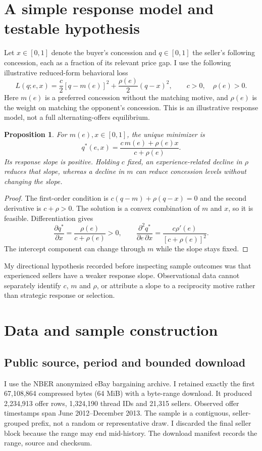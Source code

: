 \documentclass[11pt,a4paper]{article}
\newtheorem{proposition}{Proposition}
\begin{document}
\section{A simple response model and testable hypothesis}
Let $x\in[0,1]$ denote the buyer's concession and $q\in[0,1]$ the seller's
following concession, each as a fraction of its relevant price gap. I use
the following illustrative reduced-form behavioral loss
\begin{equation}
L(q;e,x)=\frac{c}{2}[q-m(e)]^2+\frac{\rho(e)}{2}(q-x)^2,
\qquad c>0,\quad\rho(e)>0.\label{eq:loss}
\end{equation}
Here $m(e)$ is a preferred concession without the matching motive, and
$\rho(e)$ is the weight on matching the opponent's concession. This is an
illustrative response model, not a full alternating-offers equilibrium.
\begin{proposition}
For $m(e),x\in[0,1]$, the unique minimizer is
\[
q^*(e,x)=\frac{c\,m(e)+\rho(e)x}{c+\rho(e)}.
\]
Its response slope is positive. Holding $c$ fixed, an experience-related
decline in $\rho$ reduces that slope, whereas a decline in $m$ can reduce
concession levels without changing the slope.
\end{proposition}
\begin{proof}
The first-order condition is $c(q-m)+\rho(q-x)=0$ and the second derivative
is $c+\rho>0$. The solution is a convex combination of $m$ and $x$, so it is
feasible. Differentiation gives
\[
\frac{\partial q^*}{\partial x}=\frac{\rho(e)}{c+\rho(e)}>0,\qquad
\frac{\partial^2q^*}{\partial e\,\partial x}
=\frac{c\rho'(e)}{[c+\rho(e)]^2}.
\]
The intercept component can change through $m$ while the slope stays fixed.
\end{proof}
My directional hypothesis recorded before inspecting sample outcomes was
that experienced sellers have a weaker response slope. Observational data
cannot separately identify $c$, $m$ and $\rho$, or attribute a slope to a
reciprocity motive rather than strategic response or selection.

\section{Data and sample construction}
\subsection{Public source, period and bounded download}
I use the NBER anonymized eBay bargaining archive. I retained exactly the
first 67,108,864 compressed bytes (64 MiB) with a byte-range download.
It produced 2,234,913 offer rows, 1,324,190 thread IDs and 21,315 sellers.
Observed offer timestamps span June 2012--December 2013. The sample is a
contiguous, seller-grouped prefix, not a random or representative draw.
I discarded the final seller block because the range may end mid-history.
The download manifest records the range, source and checksum.
\end{document}
